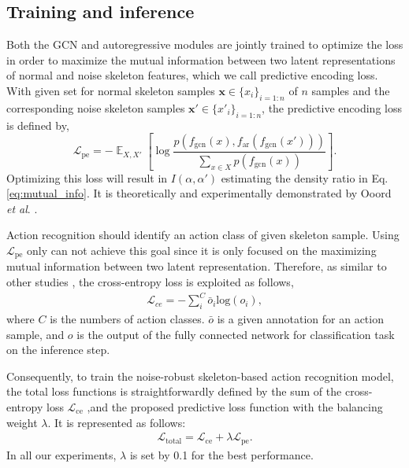 \documentclass[runningheads]{llncs}
\newcommand{\etal}{\textit{et al}. }
\begin{document}
\subsection{Training and inference}
Both the GCN and autoregressive modules are jointly trained to optimize the loss in order to maximize the mutual information between two latent representations of normal and noise skeleton features, which we call predictive encoding loss. With given set for normal skeleton samples $\boldsymbol{x}\in\{x_{i}\}_{i=1:n}$ of $n$ samples and the corresponding noise skeleton samples $\boldsymbol{x'}\in\{x'_{i}\}_{i=1:n}$, the predictive encoding loss is defined by,
\begin{equation}
\mathcal{L}_{\text{pe}} = - \mathop{{}\mathbb{E}}_{X,X'}\left[\log \frac{p(f_{\text{gcn}}(x),f_{\text{ar}}(f_{\text{gcn}}(x')))}{\sum_{x \in X} p(f_{\text{gcn}}(x))}\right].
 \label{eq:pe_loss}
\end{equation}
Optimizing this loss will result in $I(\alpha,\alpha')$ estimating the density ratio in Eq. \ref{eq:mutual_info}. It is theoretically and experimentally demonstrated by Ooord \etal \cite{oord2018representation}.

Action recognition should identify an action class of given skeleton sample. Using  $\mathcal{L}_{\text{pe}}$ only can not achieve this goal since it is only focused on the maximizing mutual information between two latent representation. Therefore, as similar to other studies \cite{shi2019two,song2019richly,shi2019multi}, the cross-entropy loss is exploited as follows, 
\begin{equation}
\begin{split}
   \mathcal{L}_{ce}=-\sum_{i}^{C}\bar{o}_{i}\text{log}(o_{i}),
   \end{split}
 \label{eq:ce_loss}
\end{equation}
where $C$ is the numbers of action classes. $\bar{o}$ is a given annotation for an action sample, and $o$ is the output of the fully connected network for classification task on the inference step. 

Consequently, to train the noise-robust skeleton-based action recognition model, the total loss functions is straightforwardly defined by the sum of the cross-entropy loss $\mathcal{L}_{\text{ce}}$ ,and the proposed predictive loss function with the balancing weight $\lambda$. It is represented as follows:
\begin{equation}
\begin{split}
   \mathcal{L}_{\text{total}}=\mathcal{L}_{\text{ce}}+\lambda\mathcal{L}_{\text{pe}}.
   \end{split}
 \label{eq:total_loss}
\end{equation}
In all our experiments, $\lambda$ is set by 0.1 for the best performance. 
\end{document}
